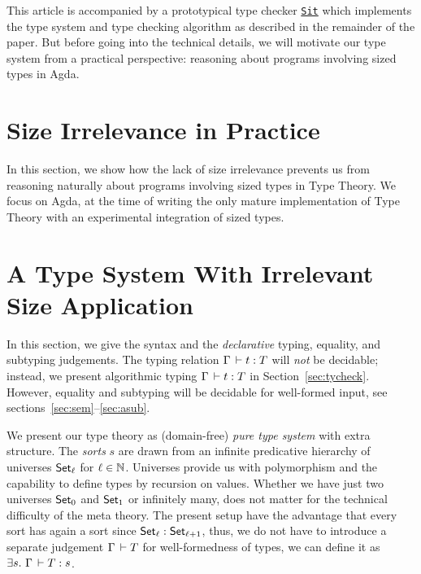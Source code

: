 \documentclass[acmsmall%
]{acmart}\settopmatter{printfolios=true}
\begin{document}
This article is accompanied by a prototypical type checker \href{https://hackage.haskell.org/package/Sit}{\texttt{Sit}} which implements the type system and type checking algorithm as described in the remainder of the paper.
But before going into the technical details, we will motivate our type system from a practical perspective: reasoning about programs involving sized types in Agda.


\section{Size Irrelevance in Practice}
\label{sec:informal}

In this section, we show how the lack of size irrelevance prevents us from reasoning naturally about programs involving sized types in Type Theory.  We focus on Agda, at the time of writing the only mature implementation of Type Theory with an experimental integration of sized types.





\section{A Type System With Irrelevant Size Application}
\label{sec:syntax}

In this section, we give the syntax and the \emph{declarative} typing, equality, and subtyping judgements.  The typing relation $\Gamma \der t : T$ will \emph{not} be decidable; instead, we present algorithmic typing $\Gamma \der t \jchk T$ in Section~\ref{sec:tycheck}.  However, equality and subtyping will be decidable for well-formed input, see sections~\ref{sec:sem}--\ref{sec:asub}.

We present our type theory as (domain-free) \emph{pure type system} \cite{barendregt:lambdacube} with extra structure.
The \emph{sorts} $s$ are drawn from an infinite predicative hierarchy of universes $\Set[\ell]$ for $\ell \in \NN$.  Universes provide us with polymorphism and the capability to define types by recursion on values.  Whether we have just two universes $\Set[0]$ and $\Set[1]$ or infinitely many, does not matter for the technical difficulty of the meta theory.  The present setup have the advantage that every sort has again a sort since $\Set[\ell] : \Set[\ell+1]$, thus, we do not have to introduce a separate judgement $\Gamma \der T$ for well-formedness of types, we can define it as $\exists s.\ \Gamma \der T : s$.
\end{document}
